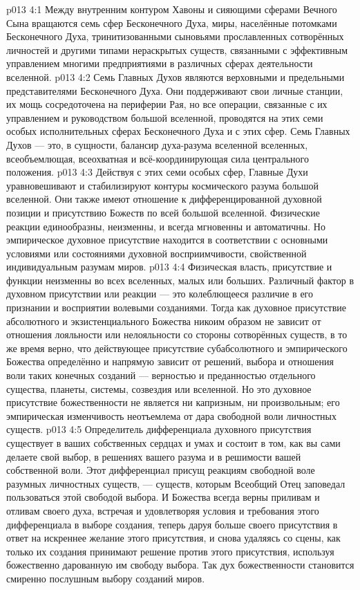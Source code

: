 \vs p013 4:1 Между внутренним контуром Хавоны и сияющими сферами Вечного Сына вращаются семь сфер Бесконечного Духа, миры, населённые потомками Бесконечного Духа, тринитизованными сыновьями прославленных сотворённых личностей и другими типами нераскрытых существ, связанными с эффективным управлением многими предприятиями в различных сферах деятельности вселенной.
\vs p013 4:2 Семь Главных Духов являются верховными и предельными представителями Бесконечного Духа. Они поддерживают свои личные станции, их мощь сосредоточена на периферии Рая, но все операции, связанные с их управлением и руководством большой вселенной, проводятся на этих семи особых исполнительных сферах Бесконечного Духа и с этих сфер. Семь Главных Духов --- это, в сущности, балансир духа\hyp{}разума вселенной вселенных, всеобъемлющая, всеохватная и всё\hyp{}координирующая сила центрального положения.
\vs p013 4:3 Действуя с этих семи особых сфер, Главные Духи уравновешивают и стабилизируют контуры космического разума большой вселенной. Они также имеют отношение к дифференцированной духовной позиции и присутствию Божеств по всей большой вселенной. Физические реакции единообразны, неизменны, и всегда мгновенны и автоматичны. Но эмпирическое духовное присутствие находится в соответствии с основными условиями или состояниями духовной восприимчивости, свойственной индивидуальным разумам миров.
\vs p013 4:4 \pc Физическая власть, присутствие и функции неизменны во всех вселенных, малых или больших. Различный фактор в духовном присутствии или реакции --- это колеблющееся различие в его признании и восприятии волевыми созданиями. Тогда как духовное присутствие абсолютного и экзистенциального Божества никоим образом не зависит от отношения лояльности или нелояльности со стороны сотворённых существ, в то же время верно, что действующее присутствие субабсолютного и эмпирического Божества определённо и напрямую зависит от решений, выбора и отношения воли таких конечных созданий --- верностью и преданностью отдельного существа, планеты, системы, созвездия или вселенной. Но это духовное присутствие божественности не является ни капризным, ни произвольным; его эмпирическая изменчивость неотъемлема от дара свободной воли личностных существ.
\vs p013 4:5 Определитель дифференциала духовного присутствия существует в ваших собственных сердцах и умах и состоит в том, как вы сами делаете свой выбор, в решениях вашего разума и в решимости вашей собственной воли. Этот дифференциал присущ реакциям свободной воле разумных личностных существ, --- существ, которым Всеобщий Отец заповедал пользоваться этой свободой выбора. И Божества всегда верны приливам и отливам своего духа, встречая и удовлетворяя условия и требования этого дифференциала в выборе создания, теперь даруя больше своего присутствия в ответ на искреннее желание этого присутствия, и снова удаляясь со сцены, как только их создания принимают решение против этого присутствия, используя божественно дарованную им свободу выбора. Так дух божественности становится смиренно послушным выбору созданий миров.
